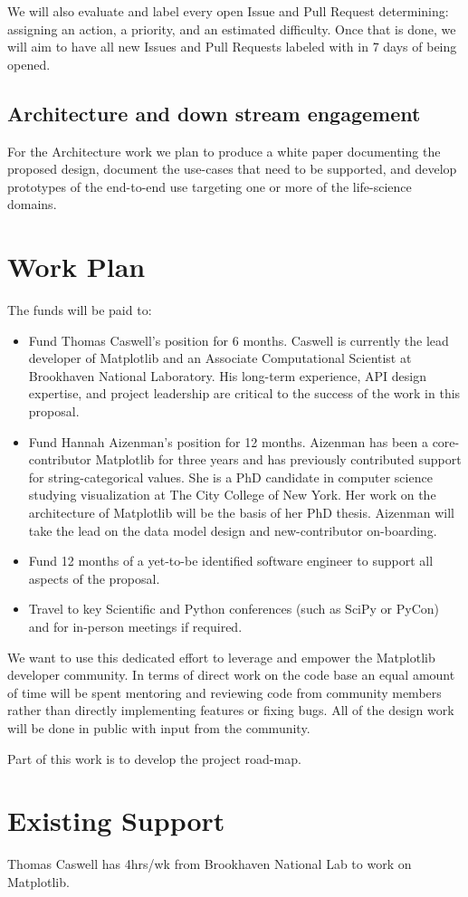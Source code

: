 \documentclass[11pt]{article}  %
\begin{document}
We will also evaluate and label every open Issue and Pull Request
determining: assigning an action, a priority, and an estimated
difficulty.  Once that is done, we will aim to have all new Issues and
Pull Requests labeled with in 7 days of being opened.


\subsection{Architecture and down stream engagement}

For the Architecture work we plan to produce a white paper documenting
the proposed design, document the use-cases that need to be supported,
and develop prototypes of the end-to-end use targeting one or more of the
life-science domains.


\section{Work Plan}

The funds will be paid to:


\begin{itemize}

\item Fund Thomas Caswell's position for 6 months.  Caswell is
  currently the lead developer of Matplotlib and an Associate
  Computational Scientist at Brookhaven National Laboratory.  His
  long-term experience, API design expertise, and project leadership
  are critical to the success of the work in this proposal.
\item Fund Hannah Aizenman's position for 12 months.  Aizenman has
  been a core-contributor Matplotlib for three years and has
  previously contributed support for string-categorical values.  She
  is a PhD candidate in computer science studying visualization at The
  City College of New York.  Her work on the architecture of
  Matplotlib will be the basis of her PhD thesis.  Aizenman will take
  the lead on the data model design and new-contributor on-boarding.
\item Fund 12 months of a yet-to-be identified software engineer to
  support all aspects of the proposal.
\item Travel to key Scientific and Python conferences (such as SciPy
  or PyCon) and for in-person meetings if required.
\end{itemize}

We want to use this dedicated effort to leverage and empower the
Matplotlib developer community.  In terms of direct work on the code
base an equal amount of time will be spent mentoring and reviewing
code from community members rather than directly implementing features
or fixing bugs.  All of the design work will be done in public with
input from the community.

Part of this work is to develop the project road-map.


\section{Existing Support}

Thomas Caswell has 4hrs/wk from Brookhaven National Lab to work on Matplotlib.


\clearpage

\end{document}
